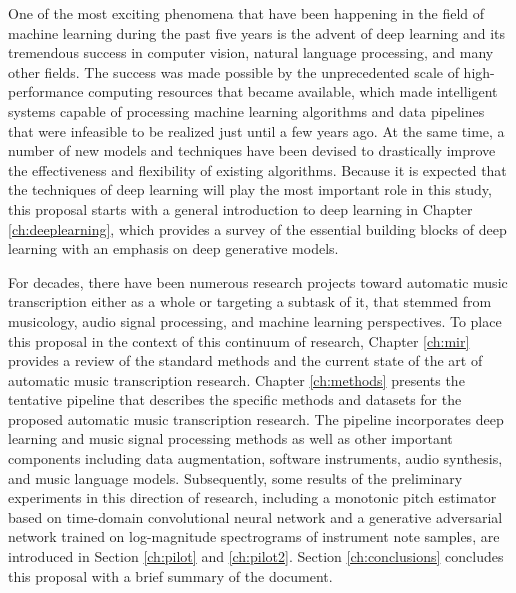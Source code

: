 One of the most exciting phenomena that have been happening in the field of machine learning during the past five years is the advent of deep learning and its tremendous success in computer vision, natural language processing, and many other fields.
The success was made possible by the unprecedented scale of high-performance computing resources that became available, which made intelligent systems capable of processing machine learning algorithms and data pipelines that were infeasible to be realized just until a few years ago.
At the same time, a number of new models and techniques have been devised to drastically improve the effectiveness and flexibility of existing algorithms.
Because it is expected that the techniques of deep learning will play the most important role in this study, this proposal starts with a general introduction to deep learning in Chapter \ref{ch:deeplearning}, which provides a survey of the essential building blocks of deep learning with an emphasis on deep generative models.


For decades, there have been numerous research projects toward automatic music transcription either as a whole or targeting a subtask of it, that stemmed from musicology, audio signal processing, and machine learning perspectives.
To place this proposal in the context of this continuum of research, Chapter \ref{ch:mir} provides a review of the standard methods and the current state of the art of automatic music transcription research.
Chapter \ref{ch:methods} presents the tentative pipeline that describes the specific methods and datasets for the proposed automatic music transcription research.
The pipeline incorporates deep learning and music signal processing methods as well as other important components including data augmentation, software instruments, audio synthesis, and music language models.
Subsequently, some results of the preliminary experiments in this direction of research, including a monotonic pitch estimator based on time-domain convolutional neural network and a generative adversarial network trained on log-magnitude spectrograms of instrument note samples, are introduced in Section \ref{ch:pilot} and \ref{ch:pilot2}.
Section \ref{ch:conclusions} concludes this proposal with a brief summary of the document.

